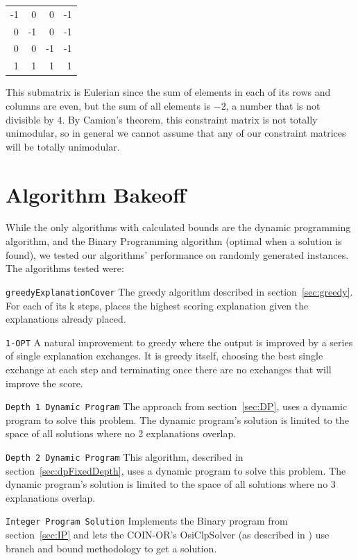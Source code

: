 \documentclass[11pt,twocolumn]{article}
\begin{document}
\begin{tabular}{rrrr}
-1 &  0 &  0 & -1 \\
 0 & -1 &  0 & -1 \\
 0 &  0 & -1 & -1 \\
 1 &  1 &  1 &  1 \\
\end{tabular}  

This submatrix is Eulerian since the sum of elements in each of its rows and columns are even, but the sum of all elements is $-2$, a number that is not divisible by $4$.  By Camion's theorem, this constraint matrix is not totally unimodular, so in general we cannot assume that any of our constraint matrices will be totally unimodular.

\FloatBarrier

\section{Algorithm Bakeoff}

While the only algorithms with calculated bounds are the dynamic programming algorithm, and the Binary Programming algorithm (optimal when a solution is found), we tested our algorithms' performance on randomly generated instances. The algorithms tested were:

\texttt{greedyExplanationCover} The greedy algorithm described in section~\ref{sec:greedy}.  For each of its k steps, places the highest scoring explanation given the explanations already placed.

\texttt{1-OPT} A natural improvement to greedy where the output is improved by a series of single explanation exchanges.  It is greedy itself, choosing the best single exchange at each step and terminating once there are no exchanges that will improve the score.

\texttt{Depth 1 Dynamic Program} The approach from section~\ref{sec:DP}, uses a dynamic program to solve this problem.  The dynamic program's solution is limited to the space of all solutions where no 2 explanations overlap.

\texttt{Depth 2 Dynamic Program} This algorithm, described in section~\ref{sec:dpFixedDepth}, uses a dynamic program to solve this problem.  The dynamic program's solution is limited to the space of all solutions where no 3 explanations overlap.

\texttt{Integer Program Solution} Implements the Binary program from section~\ref{sec:IP} and lets the COIN-OR's OsiClpSolver (as described in \cite{COIN-OR}) use branch and bound methodology to get a solution.
\end{document}

